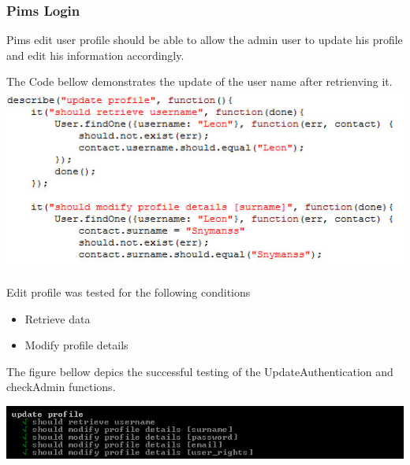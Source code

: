  \subsubsection{Pims Login}
Pims edit user profile should be able to allow the admin user to update his profile and edit his information accordingly.
\newline

The Code bellow demonstrates the update of the user name after retrienving it.
\newline
\includegraphics[width=\linewidth]{./Graphics/editCode.jpg}
\newline
		
Edit profile was  tested for the following conditions					
	\begin{itemize}
				\item Retrieve data
				\item Modify profile details
 \end{itemize}
 

 The figure bellow depics the successful testing of the UpdateAuthentication and checkAdmin functions.
 \newline
 
 \includegraphics[width=\linewidth]{./Graphics/editProfile.jpg}

 